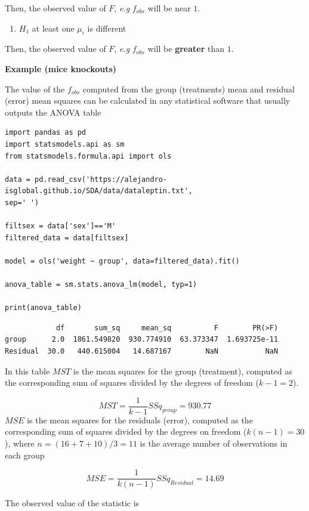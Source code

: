 \documentclass[
]{book}
\providecommand{\tightlist}{%
  \setlength{\itemsep}{0pt}\setlength{\parskip}{0pt}}
\begin{document}
Then, the observed value of \(F\), \emph{e.g} \(f_{obs}\) will be near \(1\).

\begin{enumerate}
\def\labelenumi{\alph{enumi}.}
\setcounter{enumi}{1}
\tightlist
\item
  \(H_1\) at least one \(\mu_i\) is different
\end{enumerate}

Then, the observed value of \(F\), \emph{e.g} \(f_{obs}\) will be \textbf{greater} than \(1\).

\textbf{Example (mice knockouts)}

The value of the \(f_{obs}\) computed from the group (treatments) mean and residual (error) mean squares can be calculated in any statistical software that usually outputs the ANOVA table

\begin{verbatim}
import pandas as pd
import statsmodels.api as sm
from statsmodels.formula.api import ols

data = pd.read_csv('https://alejandro-isglobal.github.io/SDA/data/dataleptin.txt', 
sep=' ')

filtsex = data['sex']=='M'
filtered_data = data[filtsex]

model = ols('weight ~ group', data=filtered_data).fit()

anova_table = sm.stats.anova_lm(model, typ=1)

print(anova_table)
\end{verbatim}

\begin{verbatim}
            df       sum_sq     mean_sq          F        PR(>F)
group      2.0  1861.549820  930.774910  63.373347  1.693725e-11
Residual  30.0   440.615004   14.687167        NaN           NaN
\end{verbatim}

In this table \(MST\) is the mean squares for the group (treatment), computed as the corresponding sum of squares divided by the degrees of freedom (\(k-1=2\)).

\[MST=\frac{1}{k-1}SSq_{group}=930.77\]
\(MSE\) is the mean squares for the residuals (error), computed as the corresponding sum of squares divided by the degrees on freedom (\(k(n-1)=30\)), where \(n=(16 + 7 + 10)/3=11\) is the average number of observations in each group

\[MSE=\frac{1}{k(n-1)}SSq_{Residual}=14.69\]

The observed value of the statistic is
\end{document}
